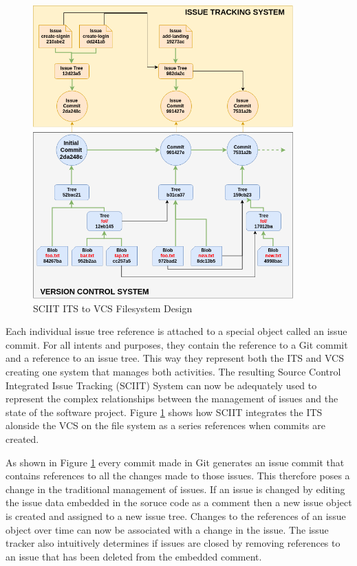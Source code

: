 \documentclass{mproj}
\begin{document}
\begin{figure}[t]
\caption{SCIIT ITS to VCS Filesystem Design}
\label{fig:sciit-filesystem}
\centering
\includegraphics[width=10cm]{sciit-filesystem}
\end{figure}


Each individual issue tree reference is attached to a special object called an issue commit. For all intents and purposes, they contain the reference to a Git commit and a reference to an issue tree. This way they represent both the ITS and VCS creating one system that manages both activities. The resulting Source Control Integrated Issue Tracking (SCIIT) System can now be adequately used to represent the complex relationships between the management of issues and the state of the software project. Figure \ref{fig:sciit-filesystem} shows how SCIIT integrates the ITS alonside the VCS on the file system as a series references when commits are created.

As shown in Figure \ref{fig:sciit-filesystem} every commit made in Git generates an issue commit that contains references to all the changes made to those issues. This therefore poses a change in the traditional management of issues. If an issue is changed by editing the issue data embedded in the soruce code as a comment then a new issue object is created and assigned to a new issue tree. Changes to the references of an issue object over time can now be associated with a change in the issue. The issue tracker also intuitively determines if issues are closed by removing references to an issue that has been deleted from the embedded comment.
\end{document}

